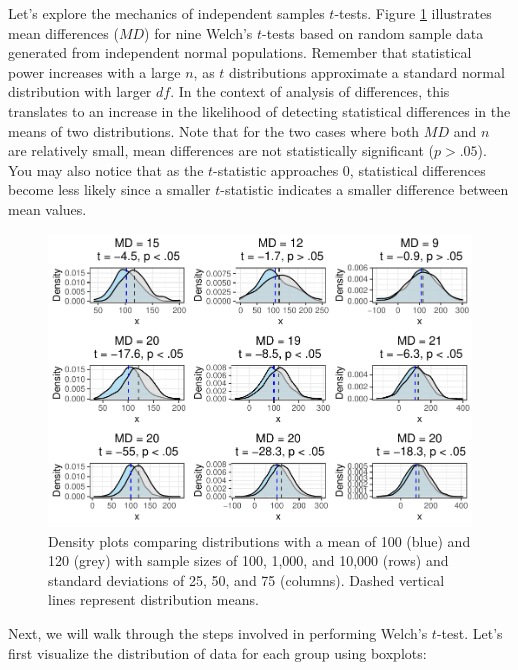 \documentclass[]{book}
\begin{document}
Let's explore the mechanics of independent samples \(t\)-tests. Figure \ref{fig:mean-group-diff} illustrates mean differences (\(MD\)) for nine Welch's \(t\)-tests based on random sample data generated from independent normal populations. Remember that statistical power increases with a large \(n\), as \(t\) distributions approximate a standard normal distribution with larger \(df\). In the context of analysis of differences, this translates to an increase in the likelihood of detecting statistical differences in the means of two distributions. Note that for the two cases where both \(MD\) and \(n\) are relatively small, mean differences are not statistically significant (\(p > .05\)). You may also notice that as the \(t\)-statistic approaches 0, statistical differences become less likely since a smaller \(t\)-statistic indicates a smaller difference between mean values.

\begin{figure}

{\centering \includegraphics[width=1\linewidth]{The_People_Analytics_Companion_files/figure-latex/mean-group-diff-1} 

}

\caption{Density plots comparing distributions with a mean of 100 (blue) and 120 (grey) with sample sizes of 100, 1,000, and 10,000 (rows) and standard deviations of 25, 50, and 75 (columns). Dashed vertical lines represent distribution means.}\label{fig:mean-group-diff}
\end{figure}

Next, we will walk through the steps involved in performing Welch's \(t\)-test. Let's first visualize the distribution of data for each group using boxplots:
\end{document}
